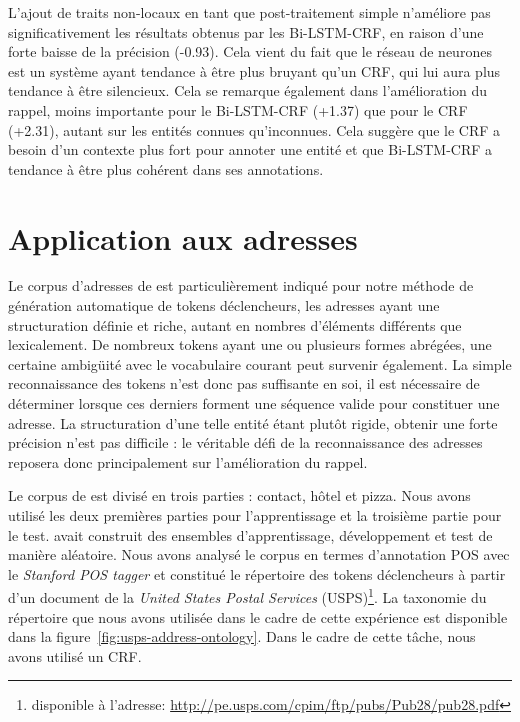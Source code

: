 \documentclass[12pt,a4paper,times,twoside,openright]{report}
\begin{document}
L'ajout de traits non-locaux en tant que post-traitement simple n'améliore pas significativement les résultats obtenus par les Bi-LSTM-CRF, en raison d'une forte baisse de la précision (-0.93). Cela vient du fait que le réseau de neurones est un système ayant tendance à être plus bruyant qu'un CRF, qui lui aura plus tendance à être silencieux. Cela se remarque également dans l'amélioration du rappel, moins importante pour le Bi-LSTM-CRF (+1.37) que pour le CRF (+2.31), autant sur les entités connues qu'inconnues. Cela suggère que le CRF a besoin d'un contexte plus fort pour annoter une entité et que Bi-LSTM-CRF a tendance à être plus cohérent dans ses annotations.



    \section{Application aux adresses}
    \label{sec:ontology-adresses}
Le corpus d'adresses de \citet{yu2007high} est particulièrement indiqué pour notre méthode de génération automatique de tokens déclencheurs, les adresses ayant une structuration définie et riche, autant en nombres d'éléments différents que lexicalement. De nombreux tokens ayant une ou plusieurs formes abrégées, une certaine ambigüité avec le vocabulaire courant peut survenir également. La simple reconnaissance des tokens n'est donc pas suffisante en soi, il est nécessaire de déterminer lorsque ces derniers forment une séquence valide pour constituer une adresse. La structuration d'une telle entité étant plutôt rigide, obtenir une forte précision n'est pas difficile : le véritable défi de la reconnaissance des adresses reposera donc principalement sur l'amélioration du rappel.

Le corpus de \citet{yu2007high} est divisé en trois parties : contact, hôtel et pizza. Nous avons utilisé les deux premières parties pour l'apprentissage et la troisième partie pour le test. \citet{yu2007high} avait construit des ensembles d'apprentissage, développement et test de manière aléatoire. Nous avons analysé le corpus en termes d'annotation POS avec le \textit{Stanford POS tagger} \citep{toutanova2003feature} et constitué le répertoire des tokens déclencheurs à partir d'un document de la \emph{United States Postal Services} (USPS)\footnote{disponible à l'adresse: \url{http://pe.usps.com/cpim/ftp/pubs/Pub28/pub28.pdf}}. La taxonomie du répertoire que nous avons utilisée dans le cadre de cette expérience est disponible dans la figure\ \ref{fig:usps-address-ontology}. Dans le cadre de cette tâche, nous avons utilisé un CRF.
\end{document}
